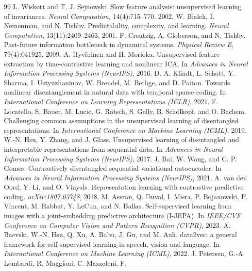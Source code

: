 \documentclass[10pt,twocolumn]{article}
\begin{document}
\clearpage
\begin{thebibliography}{99}\setlength{\itemsep}{2pt}
 L. Wiskott and T. J. Sejnowski. Slow feature
analysis: unsupervised learning of invariances. \emph{Neural Computation},
14(4):715--770, 2002.
 W. Bialek, I. Nemenman, and N. Tishby.
Predictability, complexity, and learning. \emph{Neural Computation},
13(11):2409--2463, 2001.
 F. Creutzig, A. Globerson, and N. Tishby.
Past-future information bottleneck in dynamical systems. \emph{Physical Review
E}, 79(4):041925, 2009.
 A. Hyv\"arinen and H. Morioka.
Unsupervised feature extraction by time-contrastive learning and nonlinear
ICA. In \emph{Advances in Neural Information Processing Systems (NeurIPS)},
2016.
 D. A. Klindt, L. Schott, Y. Sharma, I. Ustyuzhaninov,
W. Brendel, M. Bethge, and D. Paiton. Towards nonlinear disentanglement in
natural data with temporal sparse coding. In \emph{International Conference on
Learning Representations (ICLR)}, 2021.
 F. Locatello, S. Bauer, M. Lucic, G.
R\"atsch, S. Gelly, B. Sch\"olkopf, and O. Bachem. Challenging common
assumptions in the unsupervised learning of disentangled representations. In
\emph{International Conference on Machine Learning (ICML)}, 2019.
 W.-N. Hsu, Y. Zhang, and J. Glass. Unsupervised
learning of disentangled and interpretable representations from sequential
data. In \emph{Advances in Neural Information Processing Systems (NeurIPS)},
2017.
 J. Bai, W. Wang, and C. P. Gomes. Contrastively
disentangled sequential variational autoencoder. In \emph{Advances in Neural
Information Processing Systems (NeurIPS)}, 2021.
 A. van den Oord, Y. Li, and O. Vinyals.
Representation learning with contrastive predictive coding.
\emph{arXiv:1807.03748}, 2018.
 M. Assran, Q. Duval, I. Misra, P. Bojanowski, P.
Vincent, M. Rabbat, Y. LeCun, and N. Ballas. Self-supervised learning from
images with a joint-embedding predictive architecture (I-JEPA). In
\emph{IEEE/CVF Conference on Computer Vision and Pattern Recognition (CVPR)},
2023.
 A. Baevski, W.-N. Hsu, Q. Xu, A. Babu, J. Gu,
and M. Auli. data2vec: a general framework for self-supervised learning in
speech, vision and language. In \emph{International Conference on Machine
Learning (ICML)}, 2022.
 J. Petersen, G.-A. Lombardi, R. Maggioni, C. Mazzoleni, F.

\end{thebibliography}
\end{document}
